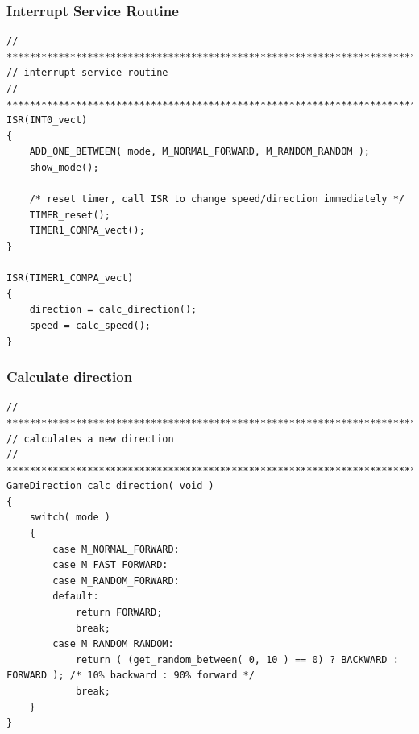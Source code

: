 \subsubsection{Interrupt Service Routine}
\begin{lstlisting}[caption={Interrupt Service Routine},label=lst:isr]
// ****************************************************************************
// interrupt service routine
// ***************************************************************************/
ISR(INT0_vect)
{
	ADD_ONE_BETWEEN( mode, M_NORMAL_FORWARD, M_RANDOM_RANDOM );
	show_mode();

	/* reset timer, call ISR to change speed/direction immediately */
	TIMER_reset();
	TIMER1_COMPA_vect();
}

ISR(TIMER1_COMPA_vect)
{
	direction = calc_direction();
	speed = calc_speed();
}
\end{lstlisting}
\vspace{0.5cm}

\subsubsection{Calculate direction}
\begin{lstlisting}[caption={Calculate direction},label=lst:calcdirection]
// ****************************************************************************
// calculates a new direction
// ***************************************************************************/
GameDirection calc_direction( void )
{
	switch( mode )
	{
		case M_NORMAL_FORWARD:
		case M_FAST_FORWARD:
		case M_RANDOM_FORWARD:
		default:
			return FORWARD;
			break;
		case M_RANDOM_RANDOM:
			return ( (get_random_between( 0, 10 ) == 0) ? BACKWARD : FORWARD ); /* 10% backward : 90% forward */
			break;
	}
}
\end{lstlisting}
\vspace{0.5cm}

